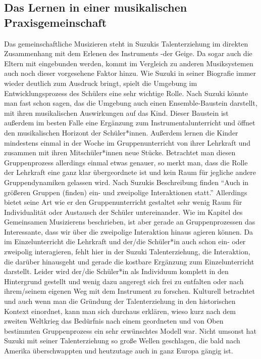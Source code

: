 \subsection{Das Lernen in einer musikalischen Praxisgemeinschaft}
Das gemeinschaftliche Musizieren steht in Suzukis Talenterziehung im direkten
Zusammenhang mit dem Erlenen des Instruments -der Geige. Da sogar auch die Eltern mit
eingebunden werden, kommt im Vergleich zu anderen Musiksystemen auch noch dieser
vorgesehene Faktor hinzu. Wie Suzuki in seiner Biografie immer wieder deutlich
zum Ausdruck bringt, spielt die Umgebung im Entwicklungsprozess des Schülers
eine sehr wichtige Rolle. Nach Suzuki könnte man fast schon sagen, das die
Umgebung auch einen Ensemble-Baustein darstellt, mit ihren musikalischen
Auswirkungen auf das Kind. Dieser Baustein ist außerdem im besten Falle eine
Ergänzung zum Instrumentalunterricht und öffnet den musikalischen Horizont der
Schüler*innen. Außerdem lernen die Kinder mindestens einmal in der Woche im
Gruppenunterricht von ihrer Lehrkraft und zusammen mit ihren Mitschüler*innen
neue Stücke. Betrachtet man diesen Gruppenprozess allerdings einmal etwas
genauer, so merkt man, dass die Rolle der Lehrkraft eine ganz klar übergeordnete
ist und kein Raum für jegliche andere Gruppendynamiken gelassen wird. Nach
Suzukis Beschreibung finden \enquote{Auch in größeren Gruppen (finden) ein- und
zweipolige Interaktionen statt.} \autocite[30]{suzuki:erziehung_ist_liebe}
Allerdings bietet seine Art wie er den Gruppenunterricht gestaltet sehr wenig
Raum für Individualität oder Austausch der Schüler untereinander. Wie im Kapitel
des Gemeinsamen Musizierens beschrieben, ist aber gerade an Gruppenprozessen das
Interessante, dass wir über die zweipolige Interaktion hinaus agieren können. Da
im Einzelunterricht die Lehrkraft und der/die Schüler*in auch schon ein- oder
zweipolig interagieren, fehlt hier in der Suzuki Talenterziehung, die
Interaktion, die darüber hinausgeht und gerade die kostbare Ergänzung zum
Einzelunterricht darstellt. Leider wird der/die Schüler*in als Individuum
komplett in den Hintergrund gestellt und wenig dazu angeregt sich frei
zu entfalten oder nach ihrem/seinem eigenen Weg mit dem Instrument zu forschen.
Kulturell betrachtet und auch wenn man die Gründung der Talenterziehung in den
historischen Kontext einordnet, kann man sich durchaus erklären, wieso kurz nach
dem zweiten Weltkrieg das Bedürfnis nach einem geordneten und von Oben
bestimmten Gruppenprozess ein sehr erwünschtes Modell war. Nicht umsonst hat
Suzuki mit seiner Talenterziehung so große Wellen geschlagen, die bald nach
Amerika überschwappten und heutzutage auch in ganz Europa gängig ist.



